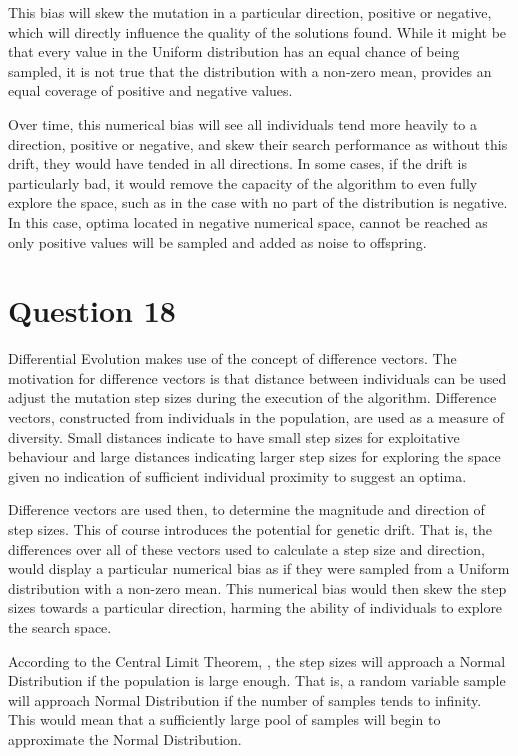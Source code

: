 \documentclass[12pt]{article}
\begin{document}
This bias will skew the mutation in a particular direction, positive or negative, which will directly influence the quality of the solutions found. While it might be that every value in the Uniform distribution has an equal chance of being sampled, it is not true that the distribution with a non-zero mean, provides an equal coverage of positive and negative values.

Over time, this numerical bias will see all individuals tend more heavily to a direction, positive or negative, and skew their search performance as without this drift, they would have tended in all directions. In some cases, if the drift is particularly bad, it would remove the capacity of the algorithm to even fully explore the space, such as in the case with no part of the distribution is negative. In this case, optima located in negative numerical space, cannot be reached as only positive values will be sampled and added as noise to offspring.
\section{Question 18}
Differential Evolution makes use of the concept of difference vectors. The motivation \cite{Storn1997} for difference vectors is that distance between individuals can be used adjust the mutation step sizes during the execution of the algorithm. Difference vectors, constructed from individuals in the population, are used as a measure of diversity. Small distances indicate to have small step sizes for exploitative behaviour and large distances indicating larger step sizes for exploring the space given no indication of sufficient individual proximity to suggest an optima.

Difference vectors are used then, to determine the magnitude and direction of step sizes. This of course introduces the potential for genetic drift. That is, the differences over all of these vectors used to calculate a step size and direction, would display a particular numerical bias as if they were sampled from a Uniform distribution with a non-zero mean. This numerical bias would then skew the step sizes towards a particular direction, harming the ability of individuals to explore the search space.

According to the Central Limit Theorem, \cite{davidson_2002}, the step sizes will approach a Normal Distribution if the population is large enough. That is, a random variable sample will approach Normal Distribution if the number of samples tends to infinity. This would mean that a sufficiently large pool of samples will begin to approximate the Normal Distribution. 
\end{document}
